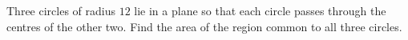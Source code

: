 Three circles of radius $12$ lie in a plane so that each circle passes through the centres of the other two. Find the area of the region common to all three circles.
